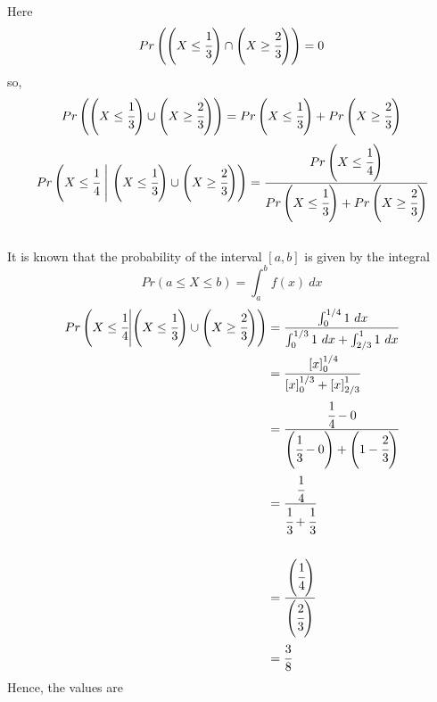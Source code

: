 \documentclass{article}
\begin{document}
\begin{enumerate}
\begin{enumerate}
        Here 
        \[ 
            Pr\left( \left( X \leq \cfrac{1}{3} \right) \cap \left( X \geq \cfrac{2}{3} \right) \right) = 0
        \]
        so,
        \[ 
            {Pr\left( \left(X \leq \cfrac{1}{3}\right) \cup \left(X \geq \cfrac{2}{3}\right) \right)} = Pr\left( X \leq \cfrac{1}{3} \right) + Pr\left( X \geq \cfrac{2}{3} \right)
        \]
        \[ 
            Pr\left( X \leq \cfrac{1}{4}\  \middle| \ \left( X \leq \cfrac{1}{3} \right) \cup \left( X \geq \cfrac{2}{3} \right) \right) = 
            \cfrac{Pr\left( X \leq \cfrac{1}{4} \right)}{Pr\left( X \leq \cfrac{1}{3} \right) + Pr\left( X \geq \cfrac{2}{3} \right)} 
        \]\\
        It is known that the probability of the interval \( [a,b] \) is given by the integral 
        \[ 
            Pr(a \leq X \leq b) = \int_{a}^{b} f(x) \ dx 
        \]
        \begin{align*} 
            Pr\left( X \leq \cfrac{1}{4} \middle| \left( X \leq \cfrac{1}{3} \right) \cup \left( X \geq \cfrac{2}{3} \right) \right) &= 
            \cfrac{\int_{0}^{1/4} 1 \ dx}{\int_{0}^{1/3} 1 \ dx + \int_{2/3}^{1} 1 \ dx} \\
            &= \cfrac{\left[ x \right]_{0}^{1/4}}{\left[ x \right]_{0}^{1/3} + \left[ x \right]_{2/3}^{1}}\\ 
            &= \cfrac{\cfrac{1}{4} - 0}{\left( \cfrac{1}{3} - 0 \right) + \left( 1 - \cfrac{2}{3} \right)} \\
            &= \cfrac{\cfrac{1}{4}}{\cfrac{1}{3} + \cfrac{1}{3}} \\\\
            &= \cfrac{\left(\cfrac{1}{4}\right)}{\left(\cfrac{2}{3}\right)} \\
            &= \cfrac{3}{8}\\ 
        \end{align*}
        Hence, the values are 


\end{enumerate}
\end{enumerate}
\end{document}
